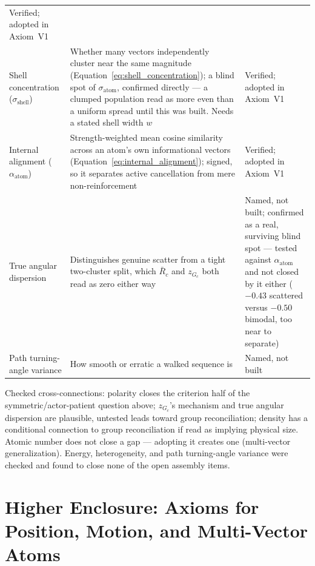 \documentclass[12pt, a4paper]{article}
\begin{document}
\begin{center}
\begin{tabular}{lp{6.5cm}l}
  Verified; adopted in Axiom~V1 \\
Shell concentration ($\sigma_{\text{shell}}$) &
  Whether many vectors independently cluster near the same
  magnitude (Equation~\eqref{eq:shell_concentration}); a blind spot
  of $\sigma_{\text{atom}}$, confirmed directly --- a clumped
  population read as more even than a uniform spread until this was
  built. Needs a stated shell width $w$ &
  Verified; adopted in Axiom~V1 \\
Internal alignment ($\alpha_{\text{atom}}$) &
  Strength-weighted mean cosine similarity across an atom's own
  informational vectors (Equation~\eqref{eq:internal_alignment});
  signed, so it separates active cancellation from mere
  non-reinforcement &
  Verified; adopted in Axiom~V1 \\
True angular dispersion &
  Distinguishes genuine scatter from a tight two-cluster split,
  which $\bar R_c$ and $z_{G_c}$ both read as zero either way &
  Named, not built; confirmed as a real, surviving blind spot ---
  tested against $\alpha_{\text{atom}}$ and not closed by it either
  ($-0.43$ scattered versus $-0.50$ bimodal, too near to separate) \\
Path turning-angle variance &
  How smooth or erratic a walked sequence is &
  Named, not built \\
\hline
\end{tabular}
\end{center}

Checked cross-connections: polarity closes the criterion half of the
symmetric/actor-patient question above; $z_{G_c}$'s mechanism and
true angular dispersion are plausible, untested leads toward group
reconciliation; density has a conditional connection to group
reconciliation if read as implying physical size. Atomic number does
not close a gap --- adopting it creates one (multi-vector
generalization). Energy, heterogeneity, and path turning-angle
variance were checked and found to close none of the open assembly
items.

\section{Higher Enclosure: Axioms for Position, Motion, and
  Multi-Vector Atoms}
\label{sec:higher_enclosure}
\end{document}
